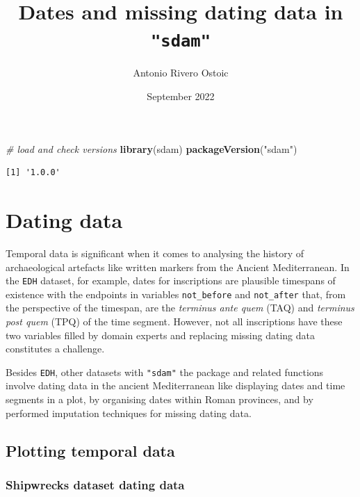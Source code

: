 \documentclass[a4paper,11pt]{memoir}
\title{Dates and missing dating data in \texttt{"sdam"}}
\author{Antonio Rivero Ostoic}
\date{September 2022}
\newenvironment{Shaded}{\begin{snugshade}}{\end{snugshade}}
\newcommand{\CommentTok}[1]{\textcolor[rgb]{0.56,0.35,0.01}{\textit{#1}}}
\newcommand{\KeywordTok}[1]{\textcolor[rgb]{0.13,0.29,0.53}{\textbf{#1}}}
\newcommand{\NormalTok}[1]{#1}
\newcommand{\StringTok}[1]{\textcolor[rgb]{0.31,0.60,0.02}{#1}}
\begin{document}
\maketitle


\begin{Shaded}
\begin{Highlighting}[]
\CommentTok{# load and check versions}
\KeywordTok{library}\NormalTok{(sdam)}
\KeywordTok{packageVersion}\NormalTok{(}\StringTok{"sdam"}\NormalTok{)}
\end{Highlighting}
\end{Shaded}

\begin{verbatim}
[1] '1.0.0'
\end{verbatim}

\hypertarget{dating-data}{%
\section{Dating data}\label{dating-data}}

Temporal data is significant when it comes to analysing the history of
archaeological artefacts like written markers from the Ancient
Mediterranean. In the \texttt{EDH} dataset, for example, dates for
inscriptions are plausible timespans of existence with the endpoints in
variables \texttt{not\_before} and \texttt{not\_after} that, from the
perspective of the timespan, are the \emph{terminus ante quem} (TAQ) and
\emph{terminus post quem} (TPQ) of the time segment. However, not all
inscriptions have these two variables filled by domain experts and
replacing missing dating data constitutes a challenge.

Besides \texttt{EDH}, other datasets with \texttt{"sdam"} the package
and related functions involve dating data in the ancient Mediterranean
like displaying dates and time segments in a plot, by organising dates
within Roman provinces, and by performed imputation techniques for
missing dating data.

\hypertarget{plotting-temporal-data}{%
\subsection{Plotting temporal data}\label{plotting-temporal-data}}

\hypertarget{shipwrecks-dataset-dating-data}{%
\subsubsection{Shipwrecks dataset dating
data}\label{shipwrecks-dataset-dating-data}}
\end{document}
